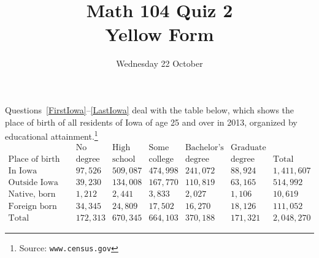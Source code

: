 \documentclass[12pt]{exam}
\title{Math 104 Quiz 2\\Yellow Form}
\date{Wednesday 22 October}
\begin{document}
\maketitle
\begin{center}
\end{center}

Questions~\ref{FirstIowa}--\ref{LastIowa} deal with
the table below, which shows the place of birth of 
all residents of Iowa of age 25 and over
in 2013, organized by educational
attainment.\footnote{Source: \tt www.census.gov}
\[\begin{array}{r|rrrrr|r}
&\text{No}&\text{High}&\text{Some}&\text{Bachelor's}&\text{Graduate}\\
\text{Place of birth}&\text{degree}
&\text{school}&\text{college}&\text{degree}&\text{degree}&\text{Total}
\\\hline
\text{In Iowa}
&97,526&509,087&474,998&241,072&88,924&1,411,607\\
\text{Outside Iowa}
&39,230&134,008&167,770&110,819&63,165&514,992\\
\text{Native, born outside US}
&1,212&2,441&3,833&2,027&1,106&10,619\\
\text{Foreign born}
&34,345&24,809&17,502&16,270&18,126&111,052\\\hline
\text{Total}
&172,313&670,345&664,103&370,188&171,321&2,048,270
\end{array}\]
\end{document}
